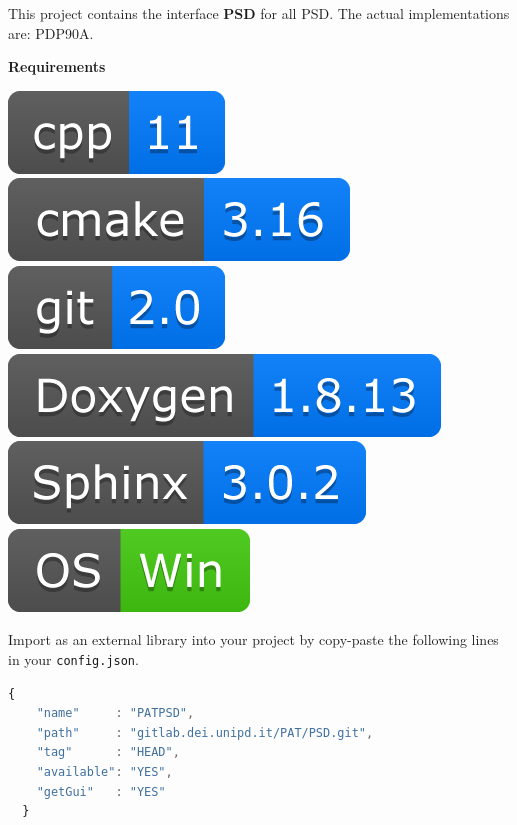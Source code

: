 
This project contains the interface \textbf{PSD} for all PSD. The actual
implementations are: PDP90A.

\textbf{Requirements}

\includegraphics[scale=0.7]{img/shilds/cpp.png}
\includegraphics[scale=0.7]{img/shilds/cmake.png}
\includegraphics[scale=0.7]{img/shilds/git.png}
\includegraphics[scale=0.7]{img/shilds/doxygen.png}
\includegraphics[scale=0.7]{img/shilds/sphinx.png}
\includegraphics[scale=0.7]{img/shilds/win.png}



Import as an external library into your project by copy-paste the
following lines in your \texttt{config.json}.

\begin{lstlisting}[language=javascript, gobble=2]
  {
    "name"     : "PATPSD",
    "path"     : "gitlab.dei.unipd.it/PAT/PSD.git",
    "tag"      : "HEAD",
    "available": "YES",
    "getGui"   : "YES"
  }
\end{lstlisting}

